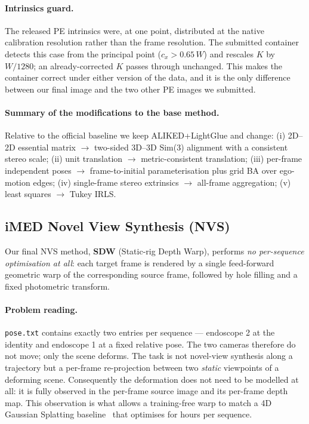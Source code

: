 \paragraph{Intrinsics guard.} The released PE intrinsics were, at one point, distributed at the native
calibration resolution rather than the frame resolution. The submitted container detects this case from
the principal point ($c_x > 0.65\,W$) and rescales $K$ by $W/1280$; an already-corrected $K$ passes
through unchanged. This makes the container correct under either version of the data, and it is the only
difference between our final image and the two other PE images we submitted.

\paragraph{Summary of the modifications to the base method.} Relative to the official baseline we keep
ALIKED+LightGlue and change: (i) 2D--2D essential matrix $\rightarrow$ two-sided 3D--3D Sim(3) alignment
with a consistent stereo scale; (ii) unit translation $\rightarrow$ metric-consistent translation;
(iii) per-frame independent poses $\rightarrow$ frame-to-initial parameterisation plus grid BA over
ego-motion edges; (iv) single-frame stereo extrinsics $\rightarrow$ all-frame aggregation;
(v) least squares $\rightarrow$ Tukey IRLS.

\subsection{iMED Novel View Synthesis (NVS)}

Our final NVS method, \textbf{SDW} (Static-rig Depth Warp), performs \emph{no per-sequence optimisation at
all}: each target frame is rendered by a single feed-forward geometric warp of the corresponding source
frame, followed by hole filling and a fixed photometric transform.

\paragraph{Problem reading.} \texttt{pose.txt} contains exactly two entries per sequence --- endoscope 2
at the identity and endoscope 1 at a fixed relative pose. The two cameras therefore do not move; only the
scene deforms. The task is not novel-view synthesis along a trajectory but a per-frame re-projection
between two \emph{static} viewpoints of a deforming scene. Consequently the deformation does not need to
be modelled at all: it is fully observed in the per-frame source image and its per-frame depth map. This
observation is what allows a training-free warp to match a 4D Gaussian Splatting
baseline~\cite{huang2024endo4dgs,kerbl2023} that optimises for hours per sequence.

